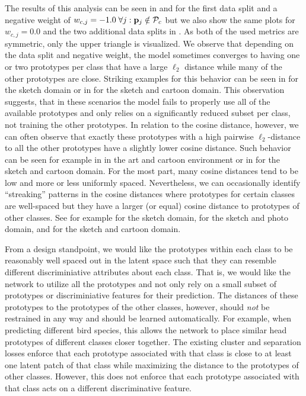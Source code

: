 The results of this analysis can be seen in  and  for the first data split and a negative weight of $w_{c,j} = -1.0\; \forall j: \mathbf{p}_{j} \notin \mathcal{P}_c$ but we also show the same plots for $w_{c,j} = 0.0$ and the two additional data splits in . As both of the used metrics are symmetric, only the upper triangle is visualized. We observe that depending on the data split and negative weight, the model sometimes converges to having one or two prototypes per class that have a large $\ell_2$ distance while many of the other prototypes are close. Striking examples for this behavior can be seen in  for the sketch domain or in  for the sketch and cartoon domain. This observation suggests, that in these scenarios the model fails to properly use all of the available prototypes and only relies on a significantly reduced subset per class, not training the other prototypes. In relation to the cosine distance, however, we can often observe that exactly these prototypes with a high pairwise $\ell_2$-distance to all the other prototypes have a slightly lower cosine distance. Such behavior can be seen for example in  in the art and cartoon environment or in  for the sketch and cartoon domain. For the most part, many cosine distances tend to be low and more or less uniformly spaced. Nevertheless, we can occasionally identify ``streaking'' patterns in the cosine distances where prototypes for certain classes are well-spaced but they have a larger (or equal) cosine distance to prototypes of other classes. See for example  for the sketch domain,  for the sketch and photo domain, and   for the sketch and cartoon domain.

From a design standpoint, we would like the prototypes within each class to be reasonably well spaced out in the latent space such that they can resemble different discriminiative attributes about each class. That is, we would like the network to utilize all the prototypes and not only rely on a small subset of prototypes or discriminiative features for their prediction. The distances of these prototypes to the prototypes of the other classes, however, should \emph{not} be restrained in any way and should be learned automatically. For example, when predicting different bird species, this allows the network to place similar head prototypes of different classes closer together. The existing cluster and separation losses enforce that each prototype associated with that class is close to at least one latent patch of that class while maximizing the distance to the prototypes of other classes. However, this does not enforce that each prototype associated with that class acts on a different discriminative feature.

